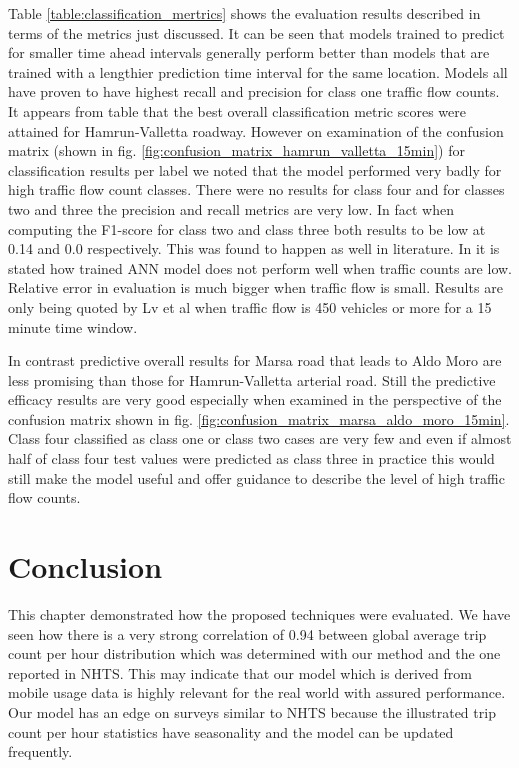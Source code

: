 \documentclass[12pt, a4paper]{report}
\theoremstyle{definition}
\theoremstyle{definition}%
\theoremstyle{definition}%
\theoremstyle{definition}%
\theoremstyle{definition}%
\theoremstyle{definition}%
\begin{document}
Table \ref{table:classification_mertrics} shows the evaluation results described in terms of the metrics just discussed. It can be seen that models trained to predict for smaller time ahead intervals generally perform better than models that are trained with a lengthier prediction time interval for the same location.  Models all have proven to have highest recall and precision for class one traffic flow counts. It appears from table that the best overall classification metric scores were attained for Hamrun-Valletta roadway. However on examination of the confusion matrix (shown in fig. \ref{fig:confusion_matrix_hamrun_valletta_15min}) for classification results per label we noted that the model performed very badly for high traffic flow count classes. There were no results for class four and for classes two and three the precision and recall metrics are very low. In fact when computing the F1-score for class two and class three both results to be low at 0.14 and 0.0 respectively. This was found to happen as well in literature. In \cite{lv2015traffic} it is stated how trained ANN model does not perform well when traffic counts are low. Relative error in evaluation is much bigger when traffic flow is small. Results are only being quoted by Lv et al when traffic flow is 450 vehicles or more for a 15 minute time window.

In contrast predictive overall results for Marsa road that leads to Aldo Moro are less promising than those for Hamrun-Valletta arterial road. Still the predictive efficacy results are very good especially when examined in the perspective of the confusion matrix shown in fig. \ref{fig:confusion_matrix_marsa_aldo_moro_15min}. Class four classified as class one or class two cases are very few and even if almost half of class four test values were predicted as class three in practice this would still make the model useful and offer guidance to describe the level of high traffic flow counts.


\section{Conclusion}

This chapter demonstrated how the proposed techniques were evaluated. We have seen how there is a very strong correlation of 0.94 between global average trip count per hour  distribution which was determined with our method and the one reported in NHTS. This may indicate that our model which is derived from mobile usage data is highly relevant for the real world with assured performance. Our model has an edge on surveys similar to NHTS because the illustrated trip count per hour statistics have seasonality and the model can be updated frequently.  
\end{document}
